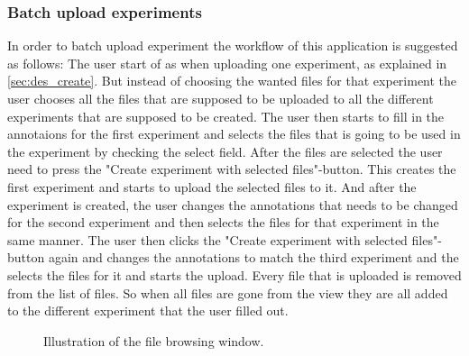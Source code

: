 \subsubsection{Batch upload experiments}
\label{sec:des_batch}
In order to batch upload experiment the workflow of this application is suggested as follows:
The user start of as when uploading one experiment, as explained in \ref{sec:des_create}. But instead of choosing the wanted files for that experiment the user chooses all the files that are supposed to be uploaded to all the different experiments that are supposed to be created. The user then starts to fill in the annotaions for the first experiment and selects the files that is going to be used in the experiment by checking the select field. After the files are selected the user need to press the "Create experiment with selected files"-button. This creates the first experiment and starts to upload the selected files to it. And after the experiment is created, the user changes the annotations that needs to be changed for the second experiment and then selects the files for that experiment in the same manner. The user then clicks the "Create experiment with selected files"-button again and changes the annotations to match the third experiment and the selects the files for it and starts the upload. Every file that is uploaded is removed from the list of files. So when all files are gone from the view they are all added to the different experiment that the user filled out.

\begin{figure}[h]
	\caption{Illustration of the file browsing window.}
	\label{fig:des_upload}
\end{figure}
\FloatBarrier

